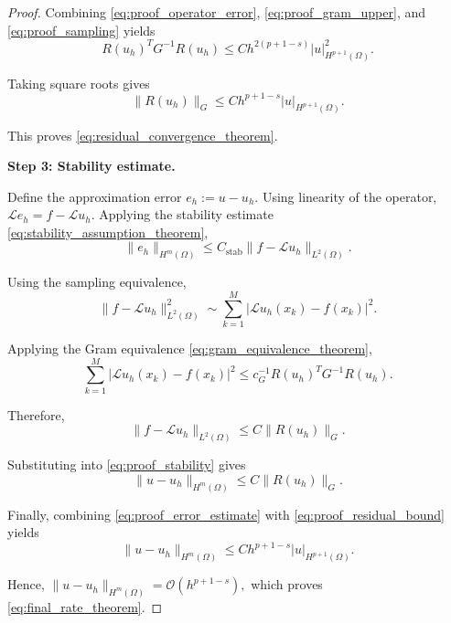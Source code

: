 \documentclass[10pt,a4paper]{amsart}
\begin{document}
\begin{proof}
Combining
\eqref{eq:proof_operator_error},
\eqref{eq:proof_gram_upper},
and
\eqref{eq:proof_sampling}
yields
\begin{equation}
R(u_h)^TG^{-1}R(u_h)
\le
Ch^{2(p+1-s)}
|u|_{H^{p+1}(\Omega)}^2.
\label{eq:proof_residual_bound_sq}
\end{equation}

Taking square roots gives
\begin{equation}
\|R(u_h)\|_G
\le
Ch^{p+1-s}
|u|_{H^{p+1}(\Omega)}.
\label{eq:proof_residual_bound}
\end{equation}

This proves
\eqref{eq:residual_convergence_theorem}.


\noindent
\textbf{Step 3: Stability estimate.}

Define the approximation error
$
e_h:=u-u_h.
$
Using linearity of the operator,
$
\mathcal{L}e_h
=
f-\mathcal{L}u_h.
$
Applying the stability estimate
\eqref{eq:stability_assumption_theorem},
\begin{equation}
\|e_h\|_{H^m(\Omega)}
\le
C_{\mathrm{stab}}
\|f-\mathcal{L}u_h\|_{L^2(\Omega)}.
\label{eq:proof_stability}
\end{equation}

Using the sampling equivalence,
\begin{equation}
\|f-\mathcal{L}u_h\|_{L^2(\Omega)}^2
\sim
\sum_{k=1}^{M}
|\mathcal{L}u_h(x_k)-f(x_k)|^2.
\label{eq:proof_sampling_residual}
\end{equation}

Applying the Gram equivalence
\eqref{eq:gram_equivalence_theorem},
\begin{equation}
\sum_{k=1}^{M}
|\mathcal{L}u_h(x_k)-f(x_k)|^2
\le
c_G^{-1}
R(u_h)^TG^{-1}R(u_h).
\label{eq:proof_gram_lower}
\end{equation}

Therefore,
\begin{equation}
\|f-\mathcal{L}u_h\|_{L^2(\Omega)}
\le
C
\|R(u_h)\|_G.
\label{eq:proof_residual_norm}
\end{equation}

Substituting into
\eqref{eq:proof_stability}
gives
\begin{equation}
\|u-u_h\|_{H^m(\Omega)}
\le
C
\|R(u_h)\|_G.
\label{eq:proof_error_estimate}
\end{equation}

Finally, combining
\eqref{eq:proof_error_estimate}
with
\eqref{eq:proof_residual_bound}
yields
\begin{equation}
\|u-u_h\|_{H^m(\Omega)}
\le
Ch^{p+1-s}
|u|_{H^{p+1}(\Omega)}.
\end{equation}

Hence,
$
\|u-u_h\|_{H^m(\Omega)}
=
\mathcal{O}(h^{p+1-s}),
$
which proves
\eqref{eq:final_rate_theorem}.

\end{proof}
\end{document}
